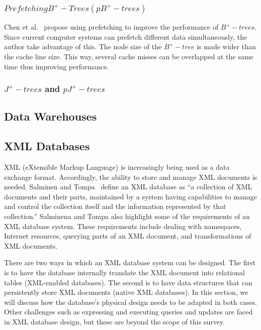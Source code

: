 \documentclass[12pt,a4paper]{article}
\begin{document}
\subsubsection*{$Prefetching B^{+}-Trees (pB^{+}-trees)$}

Chen et al.~\cite{chen2001improving} propose using prefetching to improve the performance of $B^{+}-trees$. Since current computer systems can prefetch different data simultaneously, the author take advantage of this. The node size of the $B^{+}-tree$ is made wider than the cache line size. This way, several cache misses can be overlapped at the same time thus improving performance.

\subsubsection*{$J^{+}-trees$ and $pJ^{+}-trees$}





\subsection{Data Warehouses}
\label{SEC-WAREHOUSES}

\subsection{XML Databases}
\label{SEC-XML}

XML (eXtensible Markup Language) is increasingly being used as a data exchange format. Accordingly, the ability to store and manage XML documents is needed. Salminen and Tompa~\cite{salminen2001requirements} define an XML database as ``a collection of XML documents
and their parts, maintained by a system having capabilities to
manage and control the collection itself and the information
represented by that collection.'' Salminena and Tompa also highlight some of the requirements of an XML database system. These requirements include dealing with namespaces, Internet resources, querying parts of an XML document, and transformations of XML documents.

There are two ways in which an XML database system can be designed. The first is to have the database internally translate the XML document into relational tables (XML-enabled databases). The second is to have data structures that can persistently store XML documents (native XML databases). In this section, we will discuss how the database's physical design needs to be adapted in both cases. Other challenges such as expressing and executing queries and updates are faced in XML database design, but these are beyond the scope of this survey.
\end{document}
